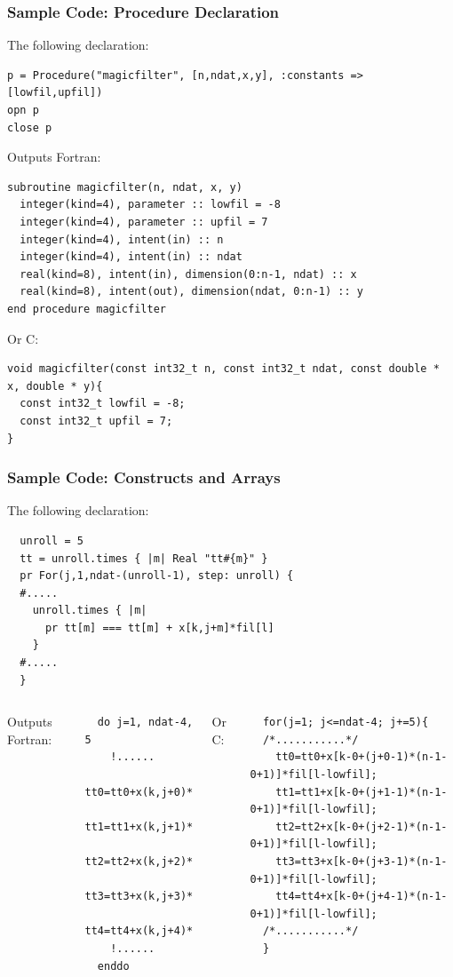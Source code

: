 \documentclass{beamer}
\begin{document}
\begin{frame}[fragile]
\frametitle{Sample Code: Procedure Declaration}
The following declaration:
\lstset{style=BOAST}
\begin{lstlisting}
p = Procedure("magicfilter", [n,ndat,x,y], :constants => [lowfil,upfil])
opn p
close p
\end{lstlisting}
Outputs Fortran:
\lstset{style=BFortran}
\begin{lstlisting}
subroutine magicfilter(n, ndat, x, y)
  integer(kind=4), parameter :: lowfil = -8
  integer(kind=4), parameter :: upfil = 7
  integer(kind=4), intent(in) :: n
  integer(kind=4), intent(in) :: ndat
  real(kind=8), intent(in), dimension(0:n-1, ndat) :: x
  real(kind=8), intent(out), dimension(ndat, 0:n-1) :: y
end procedure magicfilter
\end{lstlisting}
Or C:
\lstset{style=BC}
\begin{lstlisting}
void magicfilter(const int32_t n, const int32_t ndat, const double * x, double * y){
  const int32_t lowfil = -8;
  const int32_t upfil = 7;
}
\end{lstlisting}
\end{frame}

\begin{frame}[fragile]
\frametitle{Sample Code: Constructs and Arrays}
The following declaration:
\lstset{style=BOAST}
\begin{lstlisting}
  unroll = 5
  tt = unroll.times { |m| Real "tt#{m}" }
  pr For(j,1,ndat-(unroll-1), step: unroll) {
  #.....
    unroll.times { |m|
      pr tt[m] === tt[m] + x[k,j+m]*fil[l]
    }
  #.....
  }
\end{lstlisting}
\begin{columns}
Outputs Fortran:
\lstset{style=BFortran}
\begin{lstlisting}
  do j=1, ndat-4, 5
    !......
    tt0=tt0+x(k,j+0)*fil(l)
    tt1=tt1+x(k,j+1)*fil(l)
    tt2=tt2+x(k,j+2)*fil(l)
    tt3=tt3+x(k,j+3)*fil(l)
    tt4=tt4+x(k,j+4)*fil(l)
    !......
  enddo
\end{lstlisting}
Or C:
\lstset{style=BC}
\begin{lstlisting}
  for(j=1; j<=ndat-4; j+=5){
  /*...........*/
    tt0=tt0+x[k-0+(j+0-1)*(n-1-0+1)]*fil[l-lowfil];
    tt1=tt1+x[k-0+(j+1-1)*(n-1-0+1)]*fil[l-lowfil];
    tt2=tt2+x[k-0+(j+2-1)*(n-1-0+1)]*fil[l-lowfil];
    tt3=tt3+x[k-0+(j+3-1)*(n-1-0+1)]*fil[l-lowfil];
    tt4=tt4+x[k-0+(j+4-1)*(n-1-0+1)]*fil[l-lowfil];
  /*...........*/
  }
\end{lstlisting}
\end{columns}
\end{frame}
\end{document}
